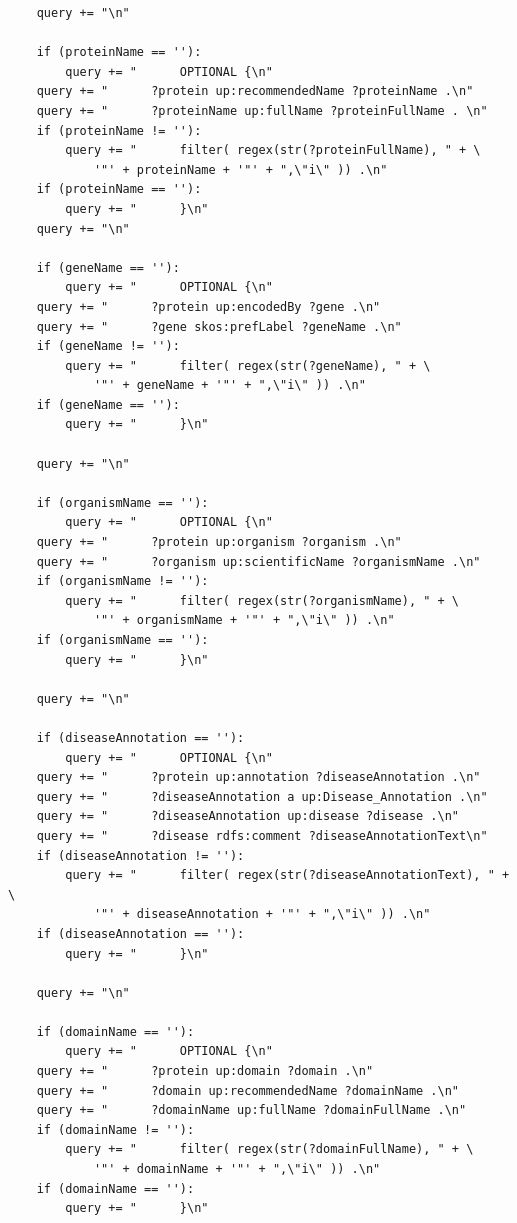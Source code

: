 \documentclass[12pt]{article}
\begin{document}
\begin{Verbatim}
    query += "\n"

    if (proteinName == ''):
        query += "      OPTIONAL {\n"
    query += "      ?protein up:recommendedName ?proteinName .\n"
    query += "      ?proteinName up:fullName ?proteinFullName . \n"
    if (proteinName != ''):
        query += "      filter( regex(str(?proteinFullName), " + \
            '"' + proteinName + '"' + ",\"i\" )) .\n"
    if (proteinName == ''):
        query += "      }\n"
    query += "\n"

    if (geneName == ''):
        query += "      OPTIONAL {\n"
    query += "      ?protein up:encodedBy ?gene .\n"
    query += "      ?gene skos:prefLabel ?geneName .\n"
    if (geneName != ''):
        query += "      filter( regex(str(?geneName), " + \
            '"' + geneName + '"' + ",\"i\" )) .\n"
    if (geneName == ''):
        query += "      }\n"

    query += "\n"

    if (organismName == ''):
        query += "      OPTIONAL {\n"
    query += "      ?protein up:organism ?organism .\n"
    query += "      ?organism up:scientificName ?organismName .\n"
    if (organismName != ''):
        query += "      filter( regex(str(?organismName), " + \
            '"' + organismName + '"' + ",\"i\" )) .\n"
    if (organismName == ''):
        query += "      }\n"

    query += "\n"

    if (diseaseAnnotation == ''):
        query += "      OPTIONAL {\n"
    query += "      ?protein up:annotation ?diseaseAnnotation .\n"
    query += "      ?diseaseAnnotation a up:Disease_Annotation .\n"
    query += "      ?diseaseAnnotation up:disease ?disease .\n"
    query += "      ?disease rdfs:comment ?diseaseAnnotationText\n"
    if (diseaseAnnotation != ''):
        query += "      filter( regex(str(?diseaseAnnotationText), " + \
            '"' + diseaseAnnotation + '"' + ",\"i\" )) .\n"
    if (diseaseAnnotation == ''):
        query += "      }\n"

    query += "\n"

    if (domainName == ''):
        query += "      OPTIONAL {\n"
    query += "      ?protein up:domain ?domain .\n"
    query += "      ?domain up:recommendedName ?domainName .\n"
    query += "      ?domainName up:fullName ?domainFullName .\n"
    if (domainName != ''):
        query += "      filter( regex(str(?domainFullName), " + \
            '"' + domainName + '"' + ",\"i\" )) .\n"
    if (domainName == ''):
        query += "      }\n"


\end{Verbatim}
\end{document}
